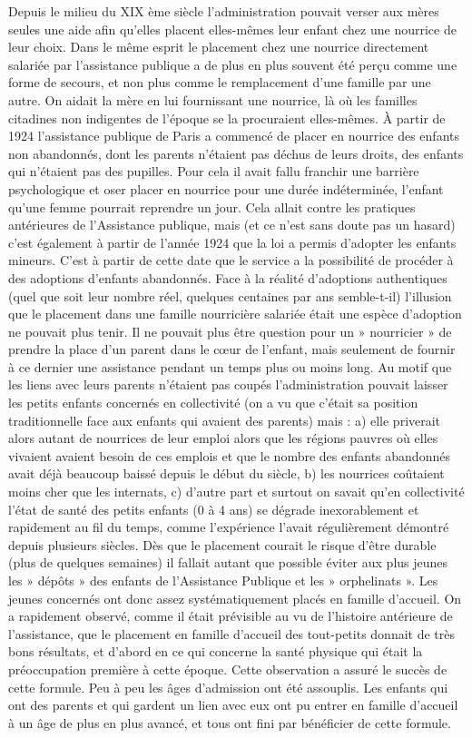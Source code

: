  Depuis le milieu du XIX ème siècle l'administration pouvait verser aux mères seules une aide afin qu'elles placent elles-mêmes leur enfant chez une nourrice de leur choix. Dans le même esprit le placement chez une nourrice directement salariée par l'assistance publique a de plus en plus souvent été perçu comme une forme de secours, et non plus comme le remplacement d'une famille par une autre. On aidait la mère en lui fournissant une nourrice, là où les familles citadines non indigentes de l'époque se la procuraient elles-mêmes. À partir de 1924 l'assistance publique de Paris a commencé de placer en nourrice des enfants non abandonnés, dont les parents n'étaient pas déchus de leurs droits, des enfants qui n'étaient pas des pupilles. 
 Pour cela il avait fallu franchir une barrière psychologique et oser placer en nourrice pour une durée indéterminée, l'enfant qu'une femme pourrait reprendre un jour. Cela allait contre les pratiques antérieures de l'Assistance publique, mais (et ce n'est sans doute pas un hasard) c'est également à partir de l'année 1924 que la loi a permis d'adopter les enfants mineurs. C'est à partir de cette date que le service a la possibilité de procéder à des adoptions d'enfants abandonnés. Face à la réalité d'adoptions authentiques (quel que soit leur nombre réel, quelques centaines par ans semble-t-il) l'illusion que le placement dans une famille nourricière salariée était une espèce d'adoption ne pouvait plus tenir. Il ne pouvait plus être question pour un » nourricier » de prendre la place d'un parent dans le cœur de l'enfant, mais seulement de fournir à ce dernier une assistance pendant un temps plus ou moins long. 
 Au motif que les liens avec leurs parents n'étaient pas coupés l'administration pouvait laisser les petits enfants concernés en collectivité (on a vu que c'était sa position traditionnelle face aux enfants qui avaient des parents) mais : a) elle priverait alors autant de nourrices de leur emploi alors que les régions pauvres où elles vivaient avaient besoin de ces emplois et que le nombre des enfants abandonnés avait déjà beaucoup baissé depuis le début du siècle, b) les nourrices coûtaient moins cher que les internats, c) d'autre part et surtout on savait qu'en collectivité l'état de santé des petits enfants (0 à 4 ans) se dégrade inexorablement et rapidement au fil du temps, comme l'expérience l'avait régulièrement démontré depuis plusieurs siècles. Dès que le placement courait le risque d'être durable (plus de quelques semaines) il fallait autant que possible éviter aux plus jeunes les » dépôts » des enfants de l'Assistance Publique et les » orphelinats ». Les jeunes concernés ont donc assez systématiquement placés en famille d'accueil. On a rapidement observé, comme il était prévisible au vu de l'histoire antérieure de l'assistance, que le placement en famille d'accueil des tout-petits donnait de très bons résultats, et d'abord en ce qui concerne la santé physique qui était la préoccupation première à cette époque. Cette observation a assuré le succès de cette formule. Peu à peu les âges d'admission ont été assouplis. Les enfants qui ont des parents et qui gardent un lien avec eux ont pu entrer en famille d'accueil à un âge de plus en plus avancé, et tous ont fini par bénéficier de cette formule. 
